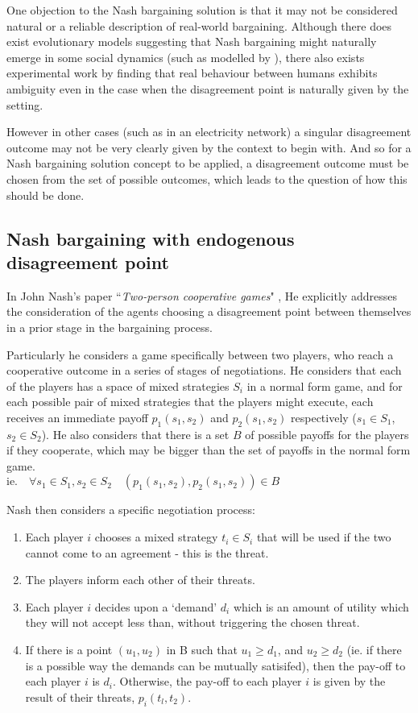 One objection to the Nash bargaining solution is that it may not be considered natural or a reliable description of real-world bargaining.
Although there does exist evolutionary models suggesting that Nash bargaining might naturally emerge in some social dynamics (such as modelled by \cite{articlechoakihiko}), there also exists experimental work by \cite{KROLL2014261} finding that real behaviour between humans exhibits ambiguity even in the case when the disagreement point is naturally given by the setting.

However in other cases (such as in an electricity network) a singular disagreement outcome may not be very clearly given by the context to begin with.
And so for a Nash bargaining solution concept to be applied, a disagreement outcome must be chosen from the set of possible outcomes, which leads to the question of how this should be done.

\subsection{Nash bargaining with endogenous disagreement point}\label{subsec:nash_bargaining_endogenous}

In John Nash's paper ``\textit{Two-person cooperative games}" \citep{nash2}, He explicitly addresses the consideration of the agents choosing a disagreement point between themselves in a prior stage in the bargaining process.

Particularly he considers a game specifically between two players, who reach a cooperative outcome in a series of stages of negotiations.
He considers that each of the players has a space of mixed strategies $S_i$ in a normal form game, and for each possible pair of mixed strategies that the players might execute, each receives an immediate payoff $p_1(s_1,s_2)$ and $p_2(s_1,s_2)$ respectively ($s_1\in S_1$, $s_2\in S_2$).
He also considers that there is a set $B$ of possible payoffs for the players if they cooperate, which may be bigger than the set of payoffs in the normal form game.\\
$\text{ie.}\quad \forall s_1\in S_1,s_2\in S_2 \quad (p_1(s_1,s_2), p_2(s_1,s_2)) \in B$

Nash then considers a specific negotiation process:
\begin{enumerate}
\item Each player $i$ chooses a mixed strategy $t_i\in S_i$ that will be used if the two cannot come to an agreement - this is the threat.
\item The players inform each other of their threats.
\item Each player $i$ decides upon a `demand' $d_i$ which is an amount of utility which they will not accept less than, without triggering the chosen threat.
\item If there is a point $(u_1,u_2)$ in B such that $u_1 \ge d_1$, and $u_2 \ge d_2$ (ie. if there is a possible way the demands can be mutually satisifed), then the pay-off to each player $i$ is $d_i$. Otherwise, the pay-off to each player $i$ is given by the result of their threats, $p_i(t_l, t_2)$.
\end{enumerate}


